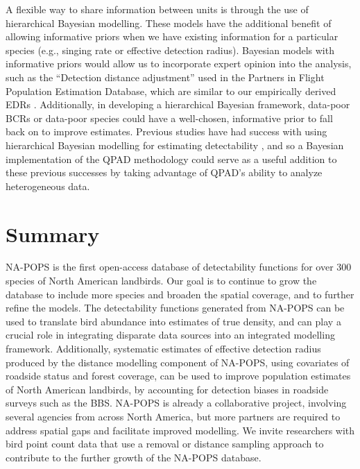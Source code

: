 \par A flexible way to share information between units is through the use of hierarchical Bayesian modelling. These models have the additional benefit of allowing informative priors when we have existing information for a particular species (e.g., singing rate or effective detection radius). Bayesian models with informative priors would allow us to incorporate expert opinion into the analysis, such as the “Detection distance adjustment” used in the Partners in Flight Population Estimation Database, which are similar to our empirically derived EDRs \citep{rosenberg_partners_2016, will_handbook_2020}. Additionally, in developing a hierarchical Bayesian framework, data-poor BCRs or data-poor species could have a well-chosen, informative prior to fall back on to improve estimates. Previous studies have had success with using hierarchical Bayesian modelling for estimating detectability \citep{amundson_hierarchical_2014, sollmann_hierarchical_2016}, and so a Bayesian implementation of the QPAD methodology could serve as a useful addition to these previous successes by taking advantage of QPAD’s ability to analyze heterogeneous data.

\section{Summary}

\par NA-POPS is the first open-access database of detectability functions for over 300 species of North American landbirds. Our goal is to continue to grow the database to include more species and broaden the spatial coverage, and to further refine the models. The detectability functions generated from NA-POPS can be used to translate bird abundance into estimates of true density, and can play a crucial role in integrating disparate data sources into an integrated modelling framework. Additionally, systematic estimates of effective detection radius produced by the distance modelling component of NA-POPS, using covariates of roadside status and forest coverage, can be used to improve population estimates of North American landbirds, by accounting for detection biases in roadside surveys such as the BBS. NA-POPS is already a collaborative project, involving several agencies from across North America, but more partners are required to address spatial gaps and facilitate improved modelling. We invite researchers with bird point count data that use a removal or distance sampling approach to contribute to the further growth of the NA-POPS database.